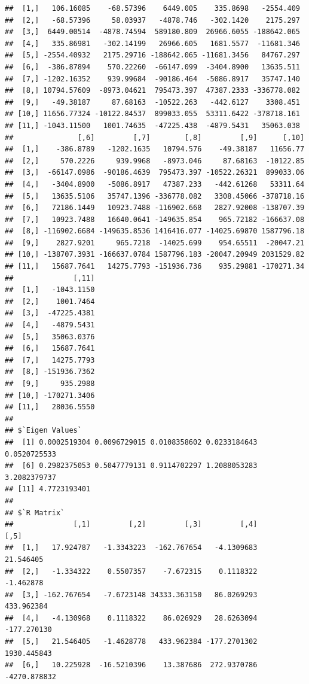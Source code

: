 \documentclass[
  10pt,
]{krantz}
\begin{document}
\begin{verbatim}
##  [1,]   106.16085    -68.57396    6449.005    335.8698   -2554.409
##  [2,]   -68.57396     58.03937   -4878.746   -302.1420    2175.297
##  [3,]  6449.00514  -4878.74594  589180.809  26966.6055 -188642.065
##  [4,]   335.86981   -302.14199   26966.605   1681.5577  -11681.346
##  [5,] -2554.40932   2175.29716 -188642.065 -11681.3456   84767.297
##  [6,]  -386.87894    570.22260  -66147.099  -3404.8900   13635.511
##  [7,] -1202.16352    939.99684  -90186.464  -5086.8917   35747.140
##  [8,] 10794.57609  -8973.04621  795473.397  47387.2333 -336778.082
##  [9,]   -49.38187     87.68163  -10522.263   -442.6127    3308.451
## [10,] 11656.77324 -10122.84537  899033.055  53311.6422 -378718.161
## [11,] -1043.11500   1001.74635  -47225.438  -4879.5431   35063.038
##               [,6]         [,7]        [,8]         [,9]      [,10]
##  [1,]    -386.8789   -1202.1635   10794.576    -49.38187   11656.77
##  [2,]     570.2226     939.9968   -8973.046     87.68163  -10122.85
##  [3,]  -66147.0986  -90186.4639  795473.397 -10522.26321  899033.06
##  [4,]   -3404.8900   -5086.8917   47387.233   -442.61268   53311.64
##  [5,]   13635.5106   35747.1396 -336778.082   3308.45066 -378718.16
##  [6,]   72186.1449   10923.7488 -116902.668   2827.92008 -138707.39
##  [7,]   10923.7488   16640.0641 -149635.854    965.72182 -166637.08
##  [8,] -116902.6684 -149635.8536 1416416.077 -14025.69870 1587796.18
##  [9,]    2827.9201     965.7218  -14025.699    954.65511  -20047.21
## [10,] -138707.3931 -166637.0784 1587796.183 -20047.20949 2031529.82
## [11,]   15687.7641   14275.7793 -151936.736    935.29881 -170271.34
##              [,11]
##  [1,]   -1043.1150
##  [2,]    1001.7464
##  [3,]  -47225.4381
##  [4,]   -4879.5431
##  [5,]   35063.0376
##  [6,]   15687.7641
##  [7,]   14275.7793
##  [8,] -151936.7362
##  [9,]     935.2988
## [10,] -170271.3406
## [11,]   28036.5550
## 
## $`Eigen Values`
##  [1] 0.0002519304 0.0096729015 0.0108358602 0.0233184643 0.0520725533
##  [6] 0.2982375053 0.5047779131 0.9114702297 1.2088053283 3.2082379737
## [11] 4.7723193401
## 
## $`R Matrix`
##              [,1]         [,2]         [,3]         [,4]         [,5]
##  [1,]   17.924787   -1.3343223  -162.767654   -4.1309683    21.546405
##  [2,]   -1.334322    0.5507357    -7.672315    0.1118322    -1.462878
##  [3,] -162.767654   -7.6723148 34333.363150   86.0269293   433.962384
##  [4,]   -4.130968    0.1118322    86.026929   28.6263094  -177.270130
##  [5,]   21.546405   -1.4628778   433.962384 -177.2701302  1930.445843
##  [6,]   10.225928  -16.5210396    13.387686  272.9370786 -4270.878832

\end{verbatim}
\end{document}
